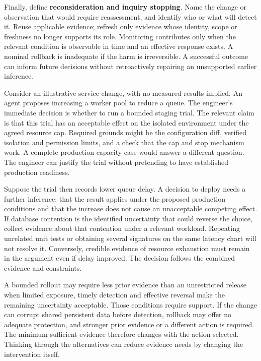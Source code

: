 \documentclass[11pt,a4paper]{article}
\begin{document}
Finally, define \textbf{reconsideration and inquiry stopping}. Name the change or observation that would require reassessment, and identify who or what will detect it. Reuse applicable evidence; refresh only evidence whose identity, scope or freshness no longer supports its role. Monitoring contributes only when the relevant condition is observable in time and an effective response exists. A nominal rollback is inadequate if the harm is irreversible. A successful outcome can inform future decisions without retroactively repairing an unsupported earlier inference.

Consider an illustrative service change, with no measured results implied. An agent proposes increasing a worker pool to reduce a queue. The engineer's immediate decision is whether to run a bounded staging trial. The relevant claim is that this trial has an acceptable effect on the isolated environment under the agreed resource cap. Required grounds might be the configuration diff, verified isolation and permission limits, and a check that the cap and stop mechanism work. A complete production-capacity case would answer a different question. The engineer can justify the trial without pretending to have established production readiness.

Suppose the trial then records lower queue delay. A decision to deploy needs a further inference: that the result applies under the proposed production conditions and that the increase does not cause an unacceptable competing effect. If database contention is the identified uncertainty that could reverse the choice, collect evidence about that contention under a relevant workload. Repeating unrelated unit tests or obtaining several signatures on the same latency chart will not resolve it. Conversely, credible evidence of resource exhaustion must remain in the argument even if delay improved. The decision follows the combined evidence and constraints.

A bounded rollout may require less prior evidence than an unrestricted release when limited exposure, timely detection and effective reversal make the remaining uncertainty acceptable. Those conditions require support. If the change can corrupt shared persistent data before detection, rollback may offer no adequate protection, and stronger prior evidence or a different action is required. The minimum sufficient evidence therefore changes with the action selected. Thinking through the alternatives can reduce evidence needs by changing the intervention itself.
\end{document}
